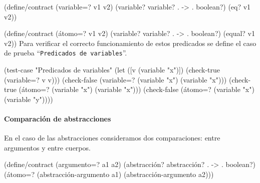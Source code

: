 \documentclass[10pt,oneside,openany,letterpaper]{book}
\begin{document}
\nwenddocs{}\endmoddef
(define/contract (variable=? v1 v2)
  (variable? variable? . -> . boolean?)
  (eq? v1 v2))

(define/contract (átomo=? v1 v2)
  (variable? variable? . -> . boolean?)
  (equal? v1 v2))
\eatline
{}\nwendcode{}\nwdocspar
Para verificar el correcto funcionamiento de estos predicados se define el caso de prueba ``{\tt{}Predicados\ de\ variables}''.

\nwenddocs{}\plusendmoddef
(test-case "Predicados de variables"
  (let ([v (variable "x")])
    (check-true (variable=? v v)))
  (check-false (variable=? (variable "x") (variable "x")))
  (check-true (átomo=? (variable "x") (variable "x")))
  (check-false (átomo=? (variable "x") (variable "y"))))
\nwendcode{}\nwdocspar

\paragraph{Comparación de abstracciones} En el caso de las abstracciones consideramos dos comparaciones: entre argumentos y entre cuerpos.

\nwenddocs{}\endmoddef
(define/contract (argumento=? a1 a2)
  (abstracción? abstracción? . -> . boolean?)
  (átomo=? (abstracción-argumento a1)
           (abstracción-argumento a2)))
\end{document}

